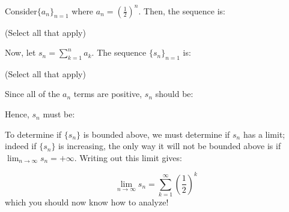 \documentclass{ximera}
\author{Jim Talamo}
\begin{document}
\begin{exercise}
Consider$\{a_n \}_{n=1}$ where $a_n = \left(\frac{1}{2}\right)^n$.  Then, the sequence is:

\begin{selectAll}
\end{selectAll}
(Select all that apply)

Now, let $s_n = \sum_{k=1}^{n} a_k$.  The sequence $\{s_n \}_{n=1}$ is:
\begin{selectAll}
\end{selectAll}
(Select all that apply)

\begin{hint}
Since all of the $a_n$ terms are positive, $s_n$ should be:

\begin{multipleChoice}
\end{multipleChoice}

Hence, $s_n$ must be:
\begin{multipleChoice}
\end{multipleChoice}

To determine if $\{s_n\}$ is bounded above, we must determine if $s_n$ has a limit; indeed if $\{s_n\}$ is increasing, the only way it will not be bounded above is if $\lim_{n \to \infty} s_n = +\infty$.  Writing out this limit gives:

\[
\lim_{n \to \infty} s_n = \sum_{k=1}^{\infty}  \left(\frac{1}{2}\right)^k
\]
which you should now know how to analyze!
\end{hint}
\end{exercise}
\end{document}
